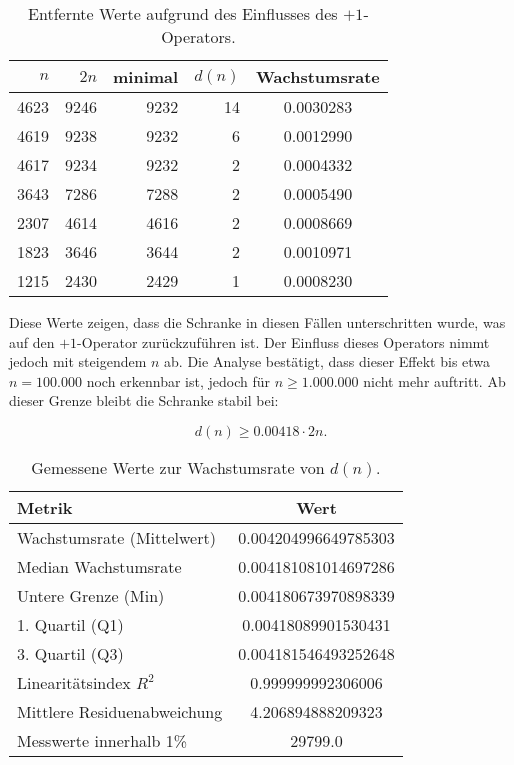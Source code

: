 \documentclass[a4paper,12pt]{article}
\begin{document}
\begin{table}[h]
    \centering
    \begin{tabular}{|r|r|r|r|c|}
        \hline
        \( n \) & \( 2n \) & minimal & \( d(n) \) & Wachstumsrate \\
        \hline
        4623  & 9246  & 9232  & 14  & 0.0030283 \\
        4619  & 9238  & 9232  & 6   & 0.0012990 \\
        4617  & 9234  & 9232  & 2   & 0.0004332 \\
        3643  & 7286  & 7288  & 2   & 0.0005490 \\
        2307  & 4614  & 4616  & 2   & 0.0008669 \\
        1823  & 3646  & 3644  & 2   & 0.0010971 \\
        1215  & 2430  & 2429  & 1   & 0.0008230 \\
        \hline
    \end{tabular}
    \caption{Entfernte Werte aufgrund des Einflusses des \( +1 \)-Operators.}
\end{table}

Diese Werte zeigen, dass die Schranke in diesen Fällen unterschritten wurde, was auf den \(+1\)-Operator zurückzuführen ist. Der Einfluss dieses Operators nimmt jedoch mit steigendem \( n \) ab. Die Analyse bestätigt, dass dieser Effekt bis etwa \( n = 100.000 \) noch erkennbar ist, jedoch für \( n \geq 1.000.000 \) nicht mehr auftritt. Ab dieser Grenze bleibt die Schranke stabil bei:

\begin{equation}
    d(n) \geq 0.00418 \cdot 2n.
\end{equation}

\begin{table}[h]
    \centering
    \begin{tabular}{|l|c|}
        \hline
        \textbf{Metrik} & \textbf{Wert} \\
        \hline
        Wachstumsrate (Mittelwert) & 0.004204996649785303 \\
        Median Wachstumsrate & 0.004181081014697286 \\
        Untere Grenze (Min) & 0.004180673970898339 \\
        1. Quartil (Q1) & 0.00418089901530431 \\
        3. Quartil (Q3) & 0.004181546493252648 \\
        Linearitätsindex \( R^2 \) & 0.999999992306006 \\
        Mittlere Residuenabweichung & 4.206894888209323 \\
        Messwerte innerhalb 1\% & 29799.0 \\
        \hline
    \end{tabular}
    \caption{Gemessene Werte zur Wachstumsrate von \( d(n) \).}
\end{table}
\end{document}
